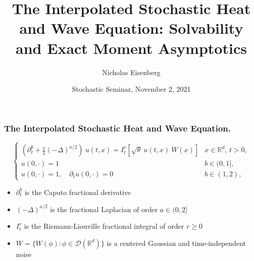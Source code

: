 \documentclass{beamer}
\title[About Beamer] %
{The Interpolated Stochastic Heat and Wave Equation: Solvability and Exact Moment Asymptotics}
\author[Arthur, Doe] %
{Nicholas Eisenberg}
\institute[VFU] %
{
	Auburn University
}
\date[VLC 2021] %
{Stochastic Seminar, November 2, 2021}
\numberwithin{equation}{section}
\newcommand{\R}{\mathbb{R}}
\begin{document}
	
	
	\frame{\titlepage}
	
	\begin{frame}[t]
		\frametitle{The Interpolated Stochastic Heat and Wave Equation.}
		
		\begin{equation*}
		\begin{cases}
		\left(\partial^b_t + \frac{\nu}{2}(-\Delta)^{a/2}\right)\: u(t,x) = I^r_t \left[\sqrt{\theta}\: u(t,x)\: \dot W(x) \right] & \text{$x\in \R^d$, $t>0$}, \\
		u(0,\cdot) = 1                                                                                                             & b \in (0,1],               \\
		u(0,\cdot) = 1, \quad \partial_t u(0,\cdot) = 0                                                                            & b \in (1,2),
		\end{cases}
		\end{equation*}
		
		
		\begin{itemize}
			\item $\partial^b_t$ is the Caputo fractional derivative
			\item $(-\Delta)^{a/2}$ is the fractional Laplacian of order $a \in (0,2]$
			\item $I^r_t$ is the Riemann-Liouville fractional integral of order $r \ge 0$ 
			\item $W = \{ W(\phi) : \phi \in \mathcal{D}(\R^d) \}$ is a centered Gaussian and time-independent noise
		\end{itemize}
		
	\end{frame}
	
\end{document}
